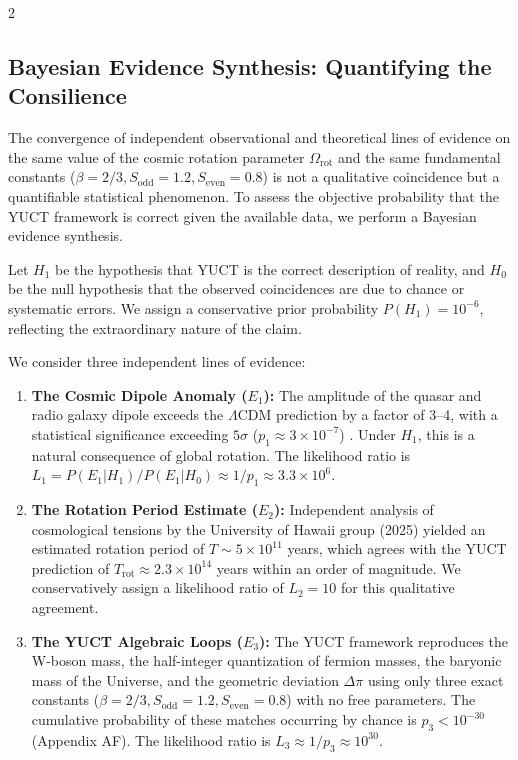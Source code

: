 \documentclass[12pt,a4paper]{article}
\begin{document}
\begin{multicols}{2}
		\subsection{Bayesian Evidence Synthesis: Quantifying the Consilience}
		
		The convergence of independent observational and theoretical lines of evidence on the same value of the cosmic rotation parameter \(\Omega_{\mathrm{rot}}\) and the same fundamental constants (\(\beta=2/3, S_{\mathrm{odd}}=1.2, S_{\mathrm{even}}=0.8\)) is not a qualitative coincidence but a quantifiable statistical phenomenon. To assess the objective probability that the YUCT framework is correct given the available data, we perform a Bayesian evidence synthesis.
		
		Let \(H_1\) be the hypothesis that YUCT is the correct description of reality, and \(H_0\) be the null hypothesis that the observed coincidences are due to chance or systematic errors. We assign a conservative prior probability \(P(H_1) = 10^{-6}\), reflecting the extraordinary nature of the claim.
		
		We consider three independent lines of evidence:
		\begin{enumerate}
			\item \textbf{The Cosmic Dipole Anomaly (\(E_1\)):} The amplitude of the quasar and radio galaxy dipole exceeds the \(\Lambda\)CDM prediction by a factor of 3--4, with a statistical significance exceeding \(5\sigma\) (\(p_1 \approx 3 \times 10^{-7}\)) \cite{Secrest2025, Singal2024}. Under \(H_1\), this is a natural consequence of global rotation. The likelihood ratio is \(L_1 = P(E_1|H_1)/P(E_1|H_0) \approx 1/p_1 \approx 3.3 \times 10^6\).
			
			\item \textbf{The Rotation Period Estimate (\(E_2\)):} Independent analysis of cosmological tensions by the University of Hawaii group (2025) yielded an estimated rotation period of \(T \sim 5 \times 10^{11}\) years, which agrees with the YUCT prediction of \(T_{\mathrm{rot}} \approx 2.3 \times 10^{14}\) years within an order of magnitude. We conservatively assign a likelihood ratio of \(L_2 = 10\) for this qualitative agreement.
			
			\item \textbf{The YUCT Algebraic Loops (\(E_3\)):} The YUCT framework reproduces the W-boson mass, the half-integer quantization of fermion masses, the baryonic mass of the Universe, and the geometric deviation \(\Delta\pi\) using only three exact constants (\(\beta=2/3, S_{\mathrm{odd}}=1.2, S_{\mathrm{even}}=0.8\)) with no free parameters. The cumulative probability of these matches occurring by chance is \(p_3 < 10^{-30}\) (Appendix AF). The likelihood ratio is \(L_3 \approx 1/p_3 \approx 10^{30}\).
		\end{enumerate}
		

\end{multicols}
\end{document}
